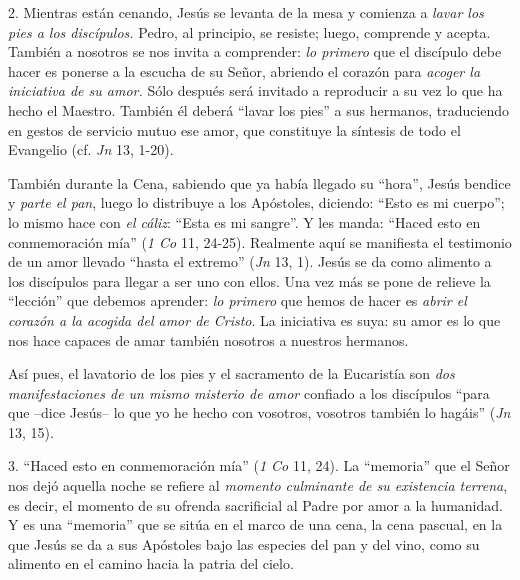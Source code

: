 			\begin{body}2. Mientras están cenando, Jesús se levanta de la mesa y comienza a \textit{lavar los pies a los discípulos. }Pedro, al principio, se resiste; luego, comprende y acepta. También a nosotros se nos invita a comprender: \textit{lo primero} que el discípulo debe hacer es ponerse a la escucha de su Señor, abriendo el corazón para \textit{acoger la iniciativa de su amor. }Sólo después será invitado a reproducir a su vez lo que ha hecho el Maestro. También él deberá “lavar los pies” a sus hermanos, traduciendo en gestos de servicio mutuo ese amor, que constituye la síntesis de todo el Evangelio (cf. \textit{Jn} 13, 1-20).\end{body}
			
			\begin{body}También durante la Cena, sabiendo que ya había llegado su “hora”, Jesús bendice y \textit{parte el pan}, luego lo distribuye a los Apóstoles, diciendo: “Esto es mi cuerpo”; lo mismo hace con \textit{el cáliz}: “Esta es mi sangre”. Y les manda: “Haced esto en conmemoración mía” (\textit{1 Co} 11, 24-25). Realmente aquí se manifiesta el testimonio de un amor llevado “hasta el extremo” (\textit{Jn} 13, 1). Jesús se da como alimento a los discípulos para llegar a ser uno con ellos. Una vez más se pone de relieve la “lección” que debemos aprender: \textit{lo primero} que hemos de hacer es \textit{abrir el corazón a la acogida del amor de Cristo}. La iniciativa es suya: su amor es lo que nos hace capaces de amar también nosotros a nuestros hermanos.\end{body}
			
			\begin{body}Así pues, el lavatorio de los pies y el sacramento de la Eucaristía son \textit{dos manifestaciones de un mismo misterio de amor} confiado a los discípulos “para que –dice Jesús– lo que yo he hecho con vosotros, vosotros también lo hagáis” (\textit{Jn} 13, 15).\end{body}
			
			\begin{body}3. “Haced esto en conmemoración mía” (\textit{1 Co} 11, 24). La “memoria” que el Señor nos dejó aquella noche se refiere al \textit{momento culminante de su existencia terrena}, es decir, el momento de su ofrenda sacrificial al Padre por amor a la humanidad. Y es una “memoria” que se sitúa en el marco de una cena, la cena pascual, en la que Jesús se da a sus Apóstoles bajo las especies del pan y del vino, como su alimento en el camino hacia la patria del cielo.\end{body}
			
